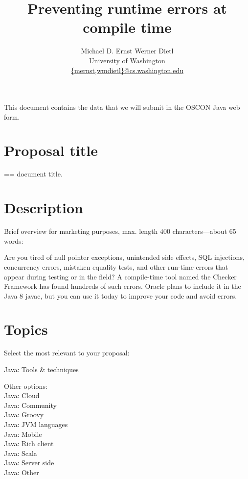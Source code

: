 \documentclass{article}
\begin{document}
\title{Preventing runtime errors at compile time
}

\author{
Michael D. Ernst
\qquad
Werner Dietl\\
University of Washington\\
\url{{mernst,wmdietl}@cs.washington.edu}
}

\maketitle


This document contains the data that we will submit in the OSCON Java
web form.


\section{Proposal title}

== document title.


\section{Description}

Brief overview for marketing purposes, max. length 400
characters---about 65 words:

\medskip

Are you tired of null pointer exceptions, unintended side effects, SQL
injections, concurrency errors, mistaken equality tests, and other run-time
errors that appear during testing or in the field?  A compile-time tool
named the Checker Framework has found hundreds of such errors.  Oracle
plans to include it in the Java 8 javac, but you can use it today to
improve your code and avoid errors.



\section{Topics}

Select the most relevant to your proposal:

\noindent
Java: Tools \& techniques

\medskip

\noindent
Other options:\\
Java: Cloud\\
Java: Community\\
Java: Groovy\\
Java: JVM languages\\
Java: Mobile\\
Java: Rich client\\
Java: Scala\\
Java: Server side\\
Java: Other
\end{document}
